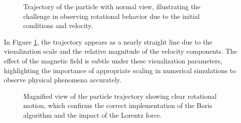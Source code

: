 \documentclass{article}
\begin{document}
\begin{figure}[H] %
    \centering
    \caption{Trajectory of the particle with normal view, illustrating the challenge in observing rotational behavior due to the initial conditions and velocity.}
    \label{fig:normal}
\end{figure}

In Figure \ref{fig:normal}, the trajectory appears as a nearly straight line due to the visualization scale and the relative magnitude of the velocity components. The effect of the magnetic field is subtle under these visualization parameters, highlighting the importance of appropriate scaling in numerical simulations to observe physical phenomena accurately.

\begin{figure}[H]
    \centering
    \caption{Magnified view of the particle trajectory showing clear rotational motion, which confirms the correct implementation of the Boris algorithm and the impact of the Lorentz force.}
    \label{fig:magnified}
\end{figure}
\end{document}
